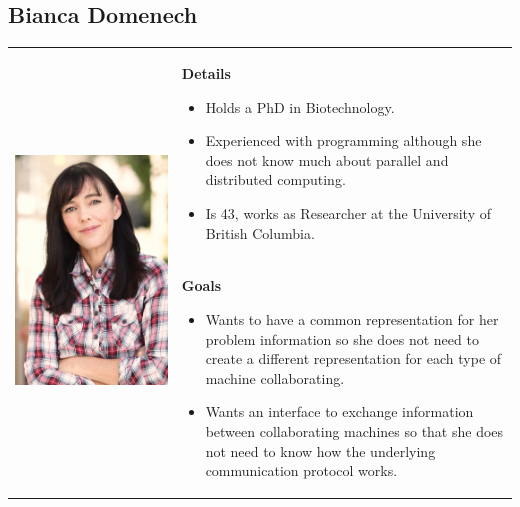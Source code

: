 \subsection*{Bianca Domenech}
\begin{table}[h]
\begin{tabular}{c p{}}
\multirow{2}{*}{
      \includegraphics[width=0.3\linewidth]{assets/images/woman1.png}
} 
& 
\multicolumn{1}{p{0.7\textwidth}}{
\textbf{Details}
\begin{itemize}
	\item Holds a PhD in Biotechnology.
	\item Experienced with programming although she does not know much about parallel and distributed computing.
	\item Is 43, works as Researcher at the University of British Columbia.
\end{itemize}
} \\
&
\textbf{Goals} 
\begin{itemize}
	\item Wants to have a common representation for her problem information so she does not need to create a different representation for each type of machine collaborating.
	\item Wants an interface to exchange information between collaborating machines so that she does not need to know how the underlying communication protocol works.
\end{itemize}   
\end{tabular}
\end{table}

\newpage
